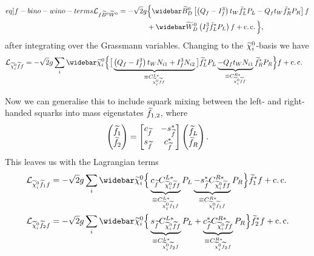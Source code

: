 \documentclass[english, notitlepage]{article}
\begin{document}
            \begin{align} \label[eq]{f-bino-wino-terms} \nonumber
                \L_{f\bino\wino} = -\sqrt{2} g & \Big\{ \wbar{\wtilde{B}}^0_D \bclosed{ \pclosed{Q_f - I^3_f}t_W \tilde{f}_L^* P_L - Q_f t_W \tilde{f}_R^* P_R } f \\
                                               & + \wbar{\wtilde{W}}^0_D \pclosed{I^3_f \tilde{f}_L^* P_L} f + \cc \Big\},
            \end{align}
            after integrating over the Grassmann variables.
            Changing to the $\nino[i]$-basis we have
            \begin{align} \label{eq:nino-sf-f-terms}
                \L_{\nino[i]\wtilde{f}f} = -\sqrt{2} g   \sum_{i} \wbar{\wtilde{\chi}}^0_i & \Big\{ \big[ \underbrace{\pclosed{Q_f - I^3_f}t_W N_{i1}  + I^3_f N_{i2}}_{\equiv C_{\nino[i] \wtilde{f} f}^{L*}} \big] \wtilde{f}_L^* P_L \underbrace{- Q_f t_W N_{i1}}_{\equiv C_{\nino[i] \wtilde{f} f}^{R*}} \wtilde{f}_R^* P_R \Big\} f + \cc
            \end{align}

            Now we can generalise this to include squark mixing between the left- and right-handed squarks into mass eigenstates \(\wtilde{f}_{1,2}\), where
            \begin{align}
                \begin{pmatrix}
                    \wtilde{f}_1 \\
                    \wtilde{f}_2
                \end{pmatrix}
                =
                \begin{bmatrix}
                    c_{\wtilde{f}} & -s_{\wtilde{f}}^* \\
                    s_{\wtilde{f}} & c_{\wtilde{f}}^*
                \end{bmatrix} \begin{pmatrix}
                                  \wtilde{f}_L \\
                                  \wtilde{f}_R
                              \end{pmatrix}.
            \end{align}
            This leaves us with the Lagrangian terms
            \begin{align}
                \label{eq:nino-sf1-f-terms}
                \L_{\nino[i] \wtilde{f}_1 f} = -\sqrt{2} g \sum_{i} \wbar{\wtilde{\chi}}^0_i & \Big\{ \underbrace{c_{\wtilde{f}} C_{\nino[i] \wtilde{f} f}^{L*}}_{\equiv C_{\nino[i] \wtilde{f}_1 f}^{L*}} P_L \underbrace{- s_{\wtilde{f}}^* C_{\nino[i] \wtilde{f} f}^{R*}}_{\equiv C_{\nino[i] \wtilde{f}_1 f}^{R*}} P_R \Big\} \wtilde{f}_1^* f + \cc \\
                \label{eq:nino-sf2-f-terms}
                \L_{\nino[i] \wtilde{f}_2 f} = -\sqrt{2} g \sum_{i} \wbar{\wtilde{\chi}}^0_i & \Big\{ \underbrace{s_{\wtilde{f}} C_{\nino[i] \wtilde{f} f}^{L*}}_{\equiv C_{\nino[i] \wtilde{f}_2 f}^{L*}} P_L + \underbrace{c_{\wtilde{f}}^* C_{\nino[i] \wtilde{f} f}^{R*}}_{\equiv C_{\nino[i] \wtilde{f}_2 f}^{R*}} P_R \Big\} \wtilde{f}_2^* f + \cc
            \end{align}
\end{document}
